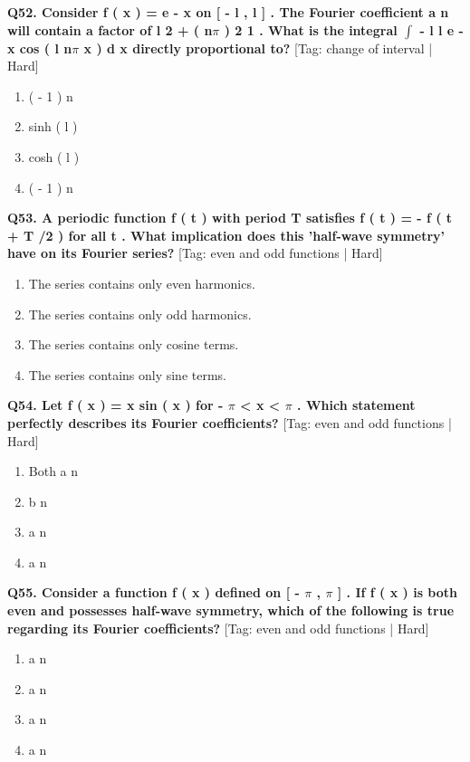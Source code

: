 \noindent\textbf{Q52. Consider f ( x ) = e - x on [ - l , l ] . The Fourier coefficient a n will contain a factor of l 2 + ( n$\pi$ ) 2 1 . What is the integral $\int$ - l l e - x cos ( l n$\pi$ x ) d x directly proportional to?} \hfill [Tag: change of interval | Hard]
\begin{enumerate}[label=(\alph*),topsep=2pt,itemsep=1pt,partopsep=0pt,parsep=0pt]
    \item {{( - 1 ) n}}
    \item {{sinh ( l )}}
    \item {{cosh ( l )}}
    \item {{( - 1 ) n}}
\end{enumerate}
\vspace{2mm}

\noindent\textbf{Q53. A periodic function f ( t ) with period T satisfies f ( t ) = - f ( t + T /2 ) for all t . What implication does this 'half-wave symmetry' have on its Fourier series?} \hfill [Tag: even and odd functions | Hard]
\begin{enumerate}[label=(\alph*),topsep=2pt,itemsep=1pt,partopsep=0pt,parsep=0pt]
    \item {{The series contains only even harmonics.}}
    \item {{The series contains only odd harmonics.}}
    \item {{The series contains only cosine terms.}}
    \item {{The series contains only sine terms.}}
\end{enumerate}
\vspace{2mm}

\noindent\textbf{Q54. Let f ( x ) = x sin ( x ) for - $\pi$ < x < $\pi$ . Which statement perfectly describes its Fourier coefficients?} \hfill [Tag: even and odd functions | Hard]
\begin{enumerate}[label=(\alph*),topsep=2pt,itemsep=1pt,partopsep=0pt,parsep=0pt]
    \item {{Both a n}}
    \item {{b n}}
    \item {{a n}}
    \item {{a n}}
\end{enumerate}
\vspace{2mm}

\noindent\textbf{Q55. Consider a function f ( x ) defined on [ - $\pi$ , $\pi$ ] . If f ( x ) is both even and possesses half-wave symmetry, which of the following is true regarding its Fourier coefficients?} \hfill [Tag: even and odd functions | Hard]
\begin{enumerate}[label=(\alph*),topsep=2pt,itemsep=1pt,partopsep=0pt,parsep=0pt]
    \item {{a n}}
    \item {{a n}}
    \item {{a n}}
    \item {{a n}}
\end{enumerate}
\vspace{2mm}


